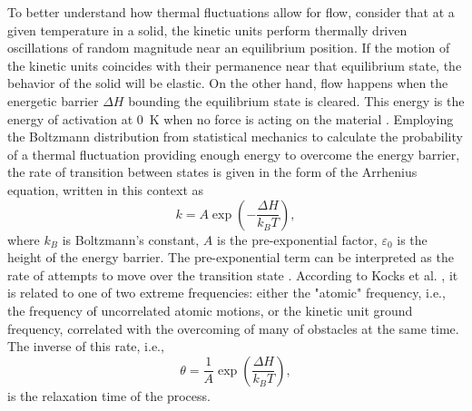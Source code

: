 To better understand how thermal fluctuations allow for flow, consider that at a given temperature in a solid, the kinetic units perform thermally driven oscillations of random magnitude near an equilibrium position.
If the motion of the kinetic units coincides with their permanence near that equilibrium state, the behavior of the solid will be elastic.
On the other hand, flow happens when the energetic barrier $\Delta H$ bounding the equilibrium state is cleared.
This energy is the energy of activation at \SI{0}{\kelvin} when no force is acting on the material \citep{kocks1975thermodynamics}.
Employing the Boltzmann distribution from statistical mechanics to calculate the probability of a thermal fluctuation providing enough energy to overcome the energy barrier, the rate of transition between states is given in the form of the Arrhenius equation, written in this context as
\begin{equation}
	k = A\exp\left(-\frac{\Delta H}{k_BT}\right),
\end{equation}
where $k_B$ is Boltzmann's constant, $A$ is the pre-exponential factor, $\varepsilon_0$ is the height of the energy barrier.
The pre-exponential term can be interpreted as the rate of attempts to move over the transition state \citep{atkins2010atkins}.
According to Kocks et al. \citep{kocks1975thermodynamics}, it is related to one of two extreme frequencies: either the "atomic" frequency, i.e., the frequency of uncorrelated atomic motions, or the kinetic unit ground frequency, correlated with the overcoming of many of obstacles at the same time.
The inverse of this rate, i.e.,
\begin{equation}
	\theta = \frac{1}{A}\exp\left(\frac{\Delta H}{k_B T}\right),
\end{equation}
is the relaxation time of the process.

